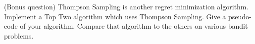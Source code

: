 \begin{questions}

\question (Bonus question) Thompson Sampling is another regret minimization algorithm. Implement a Top Two algorithm which uses Thompson Sampling. Give a pseudo-code of your algorithm. Compare that algorithm to the others on various bandit problems.

\end{questions}